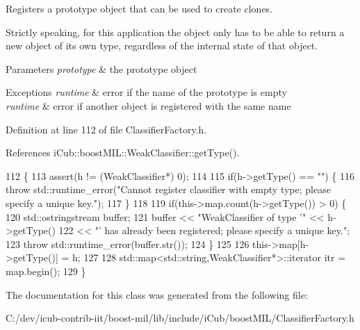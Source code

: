Registers a prototype object that can be used to create clones. 

Strictly speaking, for this application the object only has to be able to return a new object of its own type, regardless of the internal state of that object.


\begin{DoxyParams}{Parameters}
{\em prototype} & the prototype object \\
\hline
\end{DoxyParams}

\begin{DoxyExceptions}{Exceptions}
{\em runtime} & error if the name of the prototype is empty \\
\hline
{\em runtime} & error if another object is registered with the same name \\
\hline
\end{DoxyExceptions}


Definition at line 112 of file Classifier\+Factory.\+h.



References i\+Cub\+::boost\+M\+I\+L\+::\+Weak\+Classifier\+::get\+Type().


\begin{DoxyCode}
112                                                \{
113         assert(h != (WeakClassifier*) 0);
114 
115         \textcolor{keywordflow}{if}(h->getType() == \textcolor{stringliteral}{""}) \{
116             \textcolor{keywordflow}{throw} std::runtime\_error(\textcolor{stringliteral}{"Cannot register classifier with empty type; please specify a unique
       key."});
117         \}
118 
119         \textcolor{keywordflow}{if}(this->map.count(h->getType()) > 0) \{
120             std::ostringstream buffer;
121             buffer << \textcolor{stringliteral}{"WeakClassifier of type '"} << h->getType()
122                    << \textcolor{stringliteral}{"' has already been registered; please specify a unique key."};
123             \textcolor{keywordflow}{throw} std::runtime\_error(buffer.str());
124         \}
125 
126         this->map[h->getType()] = h;
127 
128         std::map<std::string,WeakClassifier*>::iterator itr = map.begin();
129     \}
\end{DoxyCode}


The documentation for this class was generated from the following file\+:\begin{DoxyCompactItemize}
\item 
C\+:/dev/icub-\/contrib-\/iit/boost-\/mil/lib/include/i\+Cub/boost\+M\+I\+L/Classifier\+Factory.\+h\end{DoxyCompactItemize}

